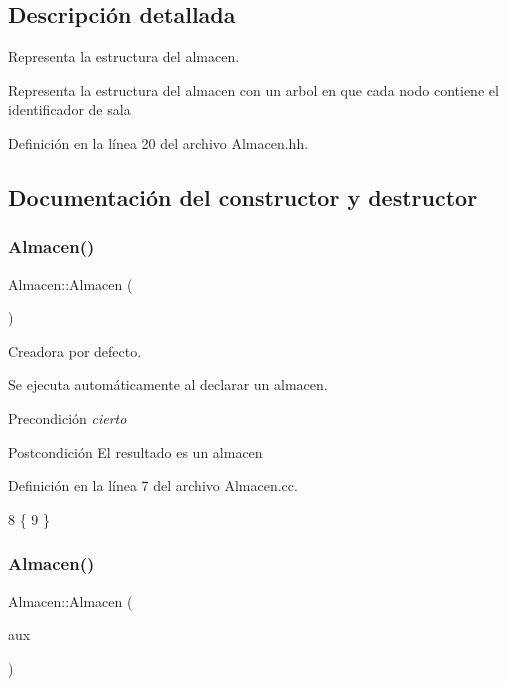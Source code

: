 \subsection{Descripción detallada}
Representa la estructura del almacen. 

Representa la estructura del almacen con un arbol en que cada nodo contiene el identificador de sala 

Definición en la línea 20 del archivo Almacen.\+hh.



\subsection{Documentación del constructor y destructor}
\mbox{\label{class_almacen_a68a6084d5775d391c52d4825072a0612}} 
\subsubsection{\texorpdfstring{Almacen()}{Almacen()}\hspace{0.1cm}{\footnotesize\ttfamily [1/2]}}
{\footnotesize\ttfamily Almacen\+::\+Almacen (\begin{DoxyParamCaption}{ }\end{DoxyParamCaption})}



Creadora por defecto. 

Se ejecuta automáticamente al declarar un almacen. \begin{DoxyPrecond}{Precondición}
{\itshape cierto} 
\end{DoxyPrecond}
\begin{DoxyPostcond}{Postcondición}
El resultado es un almacen 
\end{DoxyPostcond}


Definición en la línea 7 del archivo Almacen.\+cc.


\begin{DoxyCode}
8 \{ 
9 \}
\end{DoxyCode}
\mbox{\label{class_almacen_a1f4b6a1196d0c571c06012096e9401a2}} 
\subsubsection{\texorpdfstring{Almacen()}{Almacen()}\hspace{0.1cm}{\footnotesize\ttfamily [2/2]}}
{\footnotesize\ttfamily Almacen\+::\+Almacen (\begin{DoxyParamCaption}\item[{Bin\+Tree$<$ int $>$}]{aux }\end{DoxyParamCaption})}



